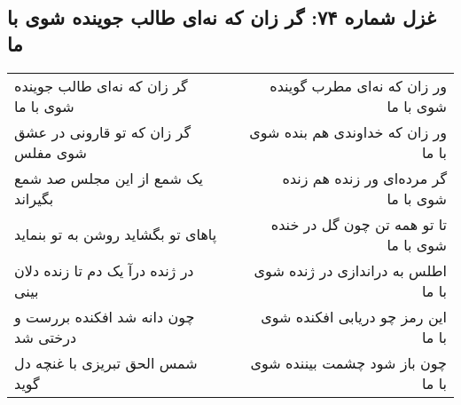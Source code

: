 \begin{center}
\section*{غزل شماره ۷۴: گر زان که نه‌ای طالب جوینده شوی با ما}
\label{sec:0074}
\begin{longtable}{l p{0.5cm} r}
گر زان که نه‌ای طالب جوینده شوی با ما
&&
ور زان که نه‌ای مطرب گوینده شوی با ما
\\
گر زان که تو قارونی در عشق شوی مفلس
&&
ور زان که خداوندی هم بنده شوی با ما
\\
یک شمع از این مجلس صد شمع بگیراند
&&
گر مرده‌ای ور زنده هم زنده شوی با ما
\\
پاهای تو بگشاید روشن به تو بنماید
&&
تا تو همه تن چون گل در خنده شوی با ما
\\
در ژنده درآ یک دم تا زنده دلان بینی
&&
اطلس به دراندازی در ژنده شوی با ما
\\
چون دانه شد افکنده بررست و درختی شد
&&
این رمز چو دریابی افکنده شوی با ما
\\
شمس الحق تبریزی با غنچه دل گوید
&&
چون باز شود چشمت بیننده شوی با ما
\\
\end{longtable}
\end{center}
